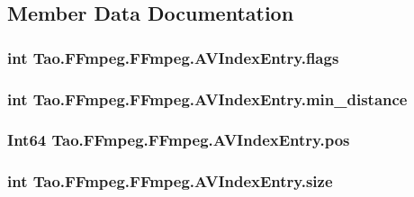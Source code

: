 \subsection{Member Data Documentation}
\hypertarget{struct_tao_1_1_f_fmpeg_1_1_f_fmpeg_1_1_a_v_index_entry_a8a5ce7168c30c00c3e5540b4d9f790f0}{
\subsubsection[{flags}]{\setlength{\rightskip}{0pt plus 5cm}int {\bf Tao.FFmpeg.FFmpeg.AVIndexEntry.flags}}}
\label{struct_tao_1_1_f_fmpeg_1_1_f_fmpeg_1_1_a_v_index_entry_a8a5ce7168c30c00c3e5540b4d9f790f0}
\hypertarget{struct_tao_1_1_f_fmpeg_1_1_f_fmpeg_1_1_a_v_index_entry_a6322bec53a1a19cd6116934831dde55c}{
\subsubsection[{min\_\-distance}]{\setlength{\rightskip}{0pt plus 5cm}int {\bf Tao.FFmpeg.FFmpeg.AVIndexEntry.min\_\-distance}}}
\label{struct_tao_1_1_f_fmpeg_1_1_f_fmpeg_1_1_a_v_index_entry_a6322bec53a1a19cd6116934831dde55c}
\hypertarget{struct_tao_1_1_f_fmpeg_1_1_f_fmpeg_1_1_a_v_index_entry_a610e917106fcb2e2bb026faa18b84db0}{
\subsubsection[{pos}]{\setlength{\rightskip}{0pt plus 5cm}Int64 {\bf Tao.FFmpeg.FFmpeg.AVIndexEntry.pos}}}
\label{struct_tao_1_1_f_fmpeg_1_1_f_fmpeg_1_1_a_v_index_entry_a610e917106fcb2e2bb026faa18b84db0}
\hypertarget{struct_tao_1_1_f_fmpeg_1_1_f_fmpeg_1_1_a_v_index_entry_a997f99cd105f41482411e62287cfad07}{
\subsubsection[{size}]{\setlength{\rightskip}{0pt plus 5cm}int {\bf Tao.FFmpeg.FFmpeg.AVIndexEntry.size}}}
